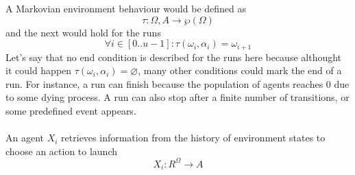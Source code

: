 \documentclass[11pt,oneside,a4paper,openright]{report}
\begin{document}
A Markovian environment behaviour would be defined as
\begin{equation}
	\tau : \Omega,A \longrightarrow \wp(\Omega)
\end{equation}
and the next would hold for the runs
\begin{equation} 
	\forall i \in [0..u-1] : \tau(\omega_i, \alpha_i) = \omega_{i+1}
\end{equation}
Let's say that no end condition is described for the runs here because althought it could happen
$\tau(\omega_i, \alpha_i) = \varnothing$, many other conditions could mark the end of a run.
For instance, a run can finish because the population of agents reaches 0 due to some dying process.
A run can also stop after a finite number of transitions, or some predefined event appears.\\
\\
An agent $X_i$ retrieves information from the history of environment states to choose an action to launch
\begin{equation}
	X_i : R^{\Omega} \longrightarrow A 
\end{equation}

\end{document}
